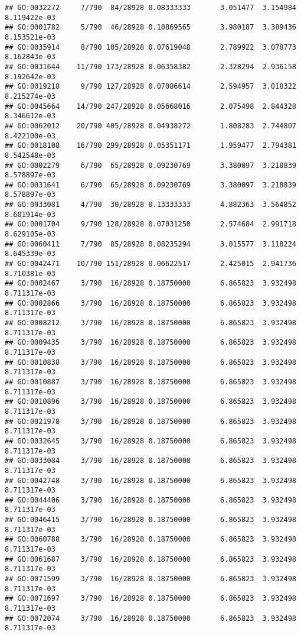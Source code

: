 \documentclass[
]{article}
\begin{document}
\begin{verbatim}
## GO:0032272     7/790  84/28928 0.08333333       3.051477  3.154984 8.119422e-03
## GO:0001782     5/790  46/28928 0.10869565       3.980187  3.389436 8.153521e-03
## GO:0035914     8/790 105/28928 0.07619048       2.789922  3.078773 8.162843e-03
## GO:0031644    11/790 173/28928 0.06358382       2.328294  2.936158 8.192642e-03
## GO:0019218     9/790 127/28928 0.07086614       2.594957  3.018322 8.215274e-03
## GO:0045664    14/790 247/28928 0.05668016       2.075498  2.844328 8.346612e-03
## GO:0062012    20/790 405/28928 0.04938272       1.808283  2.744807 8.422100e-03
## GO:0018108    16/790 299/28928 0.05351171       1.959477  2.794381 8.542548e-03
## GO:0002279     6/790  65/28928 0.09230769       3.380097  3.218839 8.578897e-03
## GO:0031641     6/790  65/28928 0.09230769       3.380097  3.218839 8.578897e-03
## GO:0033081     4/790  30/28928 0.13333333       4.882363  3.564852 8.601914e-03
## GO:0001704     9/790 128/28928 0.07031250       2.574684  2.991718 8.629105e-03
## GO:0060411     7/790  85/28928 0.08235294       3.015577  3.118224 8.645339e-03
## GO:0042471    10/790 151/28928 0.06622517       2.425015  2.941736 8.710381e-03
## GO:0002467     3/790  16/28928 0.18750000       6.865823  3.932498 8.711317e-03
## GO:0002866     3/790  16/28928 0.18750000       6.865823  3.932498 8.711317e-03
## GO:0008212     3/790  16/28928 0.18750000       6.865823  3.932498 8.711317e-03
## GO:0009435     3/790  16/28928 0.18750000       6.865823  3.932498 8.711317e-03
## GO:0010838     3/790  16/28928 0.18750000       6.865823  3.932498 8.711317e-03
## GO:0010887     3/790  16/28928 0.18750000       6.865823  3.932498 8.711317e-03
## GO:0010896     3/790  16/28928 0.18750000       6.865823  3.932498 8.711317e-03
## GO:0021978     3/790  16/28928 0.18750000       6.865823  3.932498 8.711317e-03
## GO:0032645     3/790  16/28928 0.18750000       6.865823  3.932498 8.711317e-03
## GO:0033084     3/790  16/28928 0.18750000       6.865823  3.932498 8.711317e-03
## GO:0042748     3/790  16/28928 0.18750000       6.865823  3.932498 8.711317e-03
## GO:0044406     3/790  16/28928 0.18750000       6.865823  3.932498 8.711317e-03
## GO:0046415     3/790  16/28928 0.18750000       6.865823  3.932498 8.711317e-03
## GO:0060788     3/790  16/28928 0.18750000       6.865823  3.932498 8.711317e-03
## GO:0061687     3/790  16/28928 0.18750000       6.865823  3.932498 8.711317e-03
## GO:0071599     3/790  16/28928 0.18750000       6.865823  3.932498 8.711317e-03
## GO:0071697     3/790  16/28928 0.18750000       6.865823  3.932498 8.711317e-03
## GO:0072074     3/790  16/28928 0.18750000       6.865823  3.932498 8.711317e-03

\end{verbatim}
\end{document}
